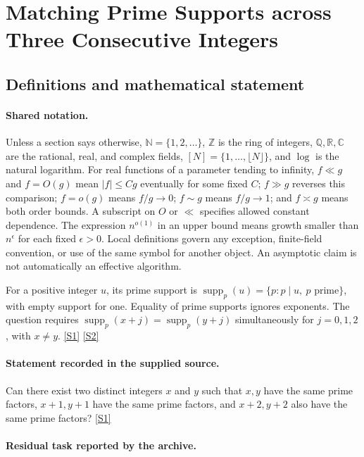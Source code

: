 \documentclass[11pt,a4paper]{article}
\newcommand{\N}{\mathbb{N}}
\newcommand{\Z}{\mathbb{Z}}
\newcommand{\Q}{\mathbb{Q}}
\newcommand{\R}{\mathbb{R}}
\newcommand{\C}{\mathbb{C}}
\newcommand{\sref}[2]{\hyperlink{source:#1:#2}{[S#2]}}
\begin{document}
\section{Matching Prime Supports across Three Consecutive Integers}\label{statement}


\subsection{Definitions and mathematical statement}

\paragraph{Shared notation.}Unless a section says otherwise, $\N=\{1,2,\ldots\}$,
$\Z$ is the ring of integers, $\Q,\R,\C$ are the rational, real, and complex
fields, $[N]=\{1,\ldots,\lfloor N\rfloor\}$, and $\log$ is the natural
logarithm. For real functions of a parameter tending to infinity,
$f\ll g$ and $f=O(g)$ mean $|f|\leq Cg$ eventually for some fixed $C$;
$f\gg g$ reverses this comparison; $f=o(g)$ means $f/g\to0$;
$f\sim g$ means $f/g\to1$; and $f\asymp g$ means both order bounds.
A subscript on $O$ or $\ll$ specifies allowed constant dependence.
The expression $n^{o(1)}$ in an upper bound means growth smaller than
$n^\epsilon$ for each fixed $\epsilon>0$. Local definitions govern any
exception, finite-field convention, or use of the same symbol for another
object. An asymptotic claim is not automatically an effective algorithm.



For a positive integer $u$, its prime support is $\operatorname{supp}_p(u)=\{p:p\mid u,\ p\text{ prime}\}$, with empty support for one. Equality of prime supports ignores exponents. The question requires $\operatorname{supp}_p(x+j)=\operatorname{supp}_p(y+j)$ simultaneously for $j=0,1,2$, with $x\ne y$. \sref{statement}{1} \sref{statement}{2}

\paragraph{Statement recorded in the supplied source.}
Can there exist two distinct integers $x$ and $y$ such that $x,y$ have the same prime factors, $x+1,y+1$ have the same prime factors, and $x+2,y+2$ also have the same prime factors? \sref{statement}{1}

\paragraph{Residual task reported by the archive.}
\end{document}

